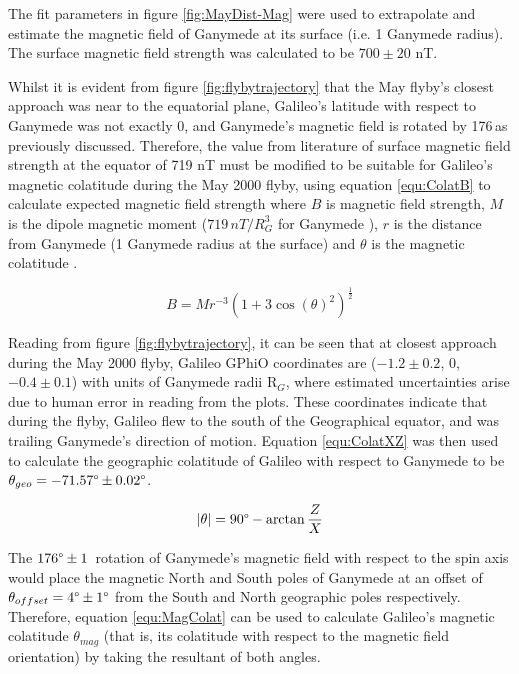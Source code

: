 \documentclass[11pt]{article}
\begin{document}
\noindent The fit parameters in figure \ref{fig:MayDist-Mag} were used to extrapolate and estimate the magnetic field of Ganymede at its surface (i.e. 1 Ganymede radius). The surface magnetic field strength was calculated to be $700 \pm 20$ nT.

Whilst it is evident from figure \ref{fig:flybytrajectory} that the May flyby's closest approach was near to the equatorial plane, Galileo's latitude with respect to Ganymede was not exactly 0\degree, and Ganymede's magnetic field is rotated by 176\degree\,as previously discussed. Therefore, the value from literature of surface magnetic field strength at the equator of 719 nT must be modified to be suitable for Galileo's magnetic colatitude during the May 2000 flyby, using equation \ref{equ:ColatB} to calculate expected magnetic field strength where $B$ is magnetic field strength, $M$ is the dipole magnetic moment ($719\,nT/R_{G}^{3}$ for Ganymede \cite{magrotation}), $r$ is the distance from Ganymede (1 Ganymede radius at the surface) and $\theta$ is the magnetic colatitude \cite{flybylines}.

\begin{equation}
\label{equ:ColatB}
    B = M r^{-3} (1+3\cos{(\theta)}^{2})^{\frac{1}{2}}
\end{equation}

Reading from figure \ref{fig:flybytrajectory}, it can be seen that at closest approach during the May 2000 flyby, Galileo GPhiO coordinates are ($-1.2 \pm 0.2$, $0$, $-0.4 \pm 0.1$) with units of Ganymede radii R$_{G}$, where estimated uncertainties arise due to human error in reading from the plots. These coordinates indicate that during the flyby, Galileo flew to the south of the Geographical equator, and was trailing Ganymede's direction of motion. Equation \ref{equ:ColatXZ} was then used to calculate the geographic colatitude of Galileo with respect to Ganymede to be $\theta_{geo} = -71.57\degree \pm 0.02\degree$.

\begin{equation}
\label{equ:ColatXZ}
    |\theta| = 90\degree - \arctan{\frac{Z}{X}}
\end{equation}

The $176\degree \pm 1$\degree\, rotation of Ganymede's magnetic field with respect to the spin axis would place the magnetic North and South poles of Ganymede at an offset of $\theta_{offset} = 4\degree \pm 1\degree$ from the South and North geographic poles respectively. Therefore, equation \ref{equ:MagColat} can be used to calculate Galileo's magnetic colatitude $\theta_{mag}$ (that is, its colatitude with respect to the magnetic field orientation) by taking the resultant of both angles.
\end{document}
